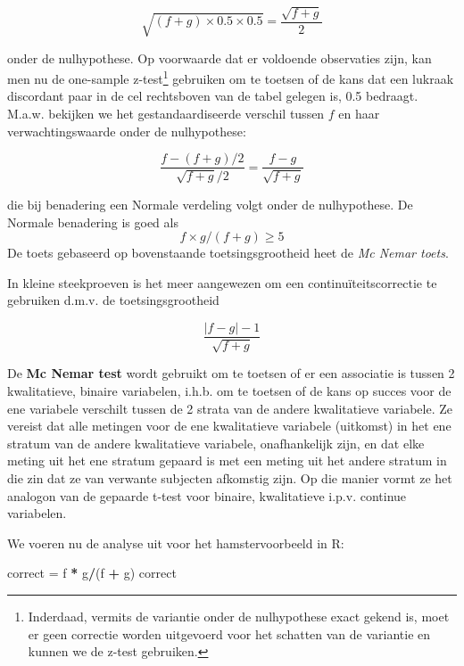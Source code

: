 \documentclass[12pt,dutch,coursenotes]{book}
\newenvironment{Shaded}{\begin{snugshade}}{\end{snugshade}}
\newcommand{\StringTok}[1]{\textcolor[rgb]{0.31,0.60,0.02}{#1}}
\newcommand{\OperatorTok}[1]{\textcolor[rgb]{0.81,0.36,0.00}{\textbf{#1}}}
\newcommand{\NormalTok}[1]{#1}
\let\rmarkdownfootnote\footnote%
\def\footnote{\protect\rmarkdownfootnote}
\theoremstyle{definition}
\theoremstyle{definition}
\theoremstyle{definition}
\theoremstyle{remark}
\begin{document}
\begin{equation*}
\sqrt{(f+g)\times 0.5\times 0.5}=\frac{\sqrt{f+g}}{2}
\end{equation*}

onder de nulhypothese. Op voorwaarde dat er voldoende observaties zijn,
kan men nu de one-sample z-test\footnote{Inderdaad, vermits de variantie
  onder de nulhypothese exact gekend is, moet er geen correctie worden
  uitgevoerd voor het schatten van de variantie en kunnen we de z-test
  gebruiken.} gebruiken om te toetsen of de kans dat een lukraak
discordant paar in de cel rechtsboven van de tabel gelegen is, 0.5
bedraagt. M.a.w. bekijken we het gestandaardiseerde verschil tussen
\(f\) en haar verwachtingswaarde onder de nulhypothese:

\begin{equation*}
\frac{f-(f+g)/2}{\sqrt{f+g}/2}=\frac{f-g}{\sqrt{f+g}}
\end{equation*}

die bij benadering een Normale verdeling volgt onder de nulhypothese. De
Normale benadering is goed als \[f \times g/(f+g) \geq 5\] De toets
gebaseerd op bovenstaande toetsingsgrootheid heet de \emph{Mc Nemar
toets}.

In kleine steekproeven is het meer aangewezen om een
continuïteitscorrectie te gebruiken d.m.v. de toetsingsgrootheid

\begin{equation*}
\frac{|f-g|-1}{\sqrt{f+g}}
\end{equation*}

De \textbf{Mc Nemar test} wordt gebruikt om te toetsen of er een
associatie is tussen 2 kwalitatieve, binaire variabelen, i.h.b. om te
toetsen of de kans op succes voor de ene variabele verschilt tussen de 2
strata van de andere kwalitatieve variabele. Ze vereist dat alle
metingen voor de ene kwalitatieve variabele (uitkomst) in het ene
stratum van de andere kwalitatieve variabele, onafhankelijk zijn, en dat
elke meting uit het ene stratum gepaard is met een meting uit het andere
stratum in die zin dat ze van verwante subjecten afkomstig zijn. Op die
manier vormt ze het analogon van de gepaarde t-test voor binaire,
kwalitatieve i.p.v. continue variabelen.

We voeren nu de analyse uit voor het hamstervoorbeeld in R:

\begin{Shaded}
\begin{Highlighting}[]
\NormalTok{correct =}\StringTok{ }\NormalTok{f }\OperatorTok{*}\StringTok{ }\NormalTok{g}\OperatorTok{/}\NormalTok{(f }\OperatorTok{+}\StringTok{ }\NormalTok{g)}
\NormalTok{correct}
\end{Highlighting}
\end{Shaded}
\end{document}
